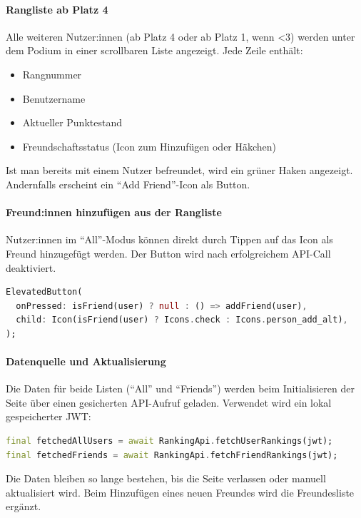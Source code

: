 \documentclass[11pt,a4paper]{article}
\begin{document}
\paragraph{Rangliste ab Platz 4}
Alle weiteren Nutzer:innen (ab Platz 4 oder ab Platz 1, wenn <3) werden unter dem Podium in einer scrollbaren Liste angezeigt. Jede Zeile enthält:
\begin{itemize}
    \item Rangnummer
    \item Benutzername
    \item Aktueller Punktestand
    \item Freundschaftsstatus (Icon zum Hinzufügen oder Häkchen)
\end{itemize}

Ist man bereits mit einem Nutzer befreundet, wird ein grüner Haken angezeigt. Andernfalls erscheint ein ``Add Friend''-Icon als Button.

\paragraph{Freund:innen hinzufügen aus der Rangliste}
Nutzer:innen im ``All''-Modus können direkt durch Tippen auf das Icon als Freund hinzugefügt werden. Der Button wird nach erfolgreichem API-Call deaktiviert.

\begin{lstlisting}[language=Dart, caption=Freundschaft aus der Rangliste anfragen]
ElevatedButton(
  onPressed: isFriend(user) ? null : () => addFriend(user),
  child: Icon(isFriend(user) ? Icons.check : Icons.person_add_alt),
);
\end{lstlisting}

\paragraph{Datenquelle und Aktualisierung}
Die Daten für beide Listen (``All'' und ``Friends'') werden beim Initialisieren der Seite über einen gesicherten API-Aufruf geladen. Verwendet wird ein lokal gespeicherter JWT:

\begin{lstlisting}[language=Dart, caption=Laden der Ranglisten über API]
final fetchedAllUsers = await RankingApi.fetchUserRankings(jwt);
final fetchedFriends = await RankingApi.fetchFriendRankings(jwt);
\end{lstlisting}

Die Daten bleiben so lange bestehen, bis die Seite verlassen oder manuell aktualisiert wird. Beim Hinzufügen eines neuen Freundes wird die Freundesliste ergänzt.
\end{document}
